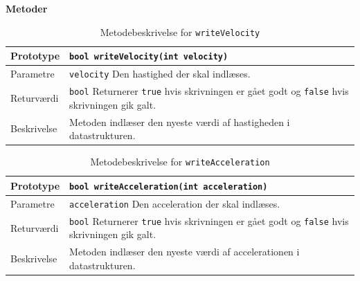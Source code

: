 \textbf{Metoder}
\begin{table}[h]
\begin{tabularx}{\textwidth}{| L{2.5 cm} | Z |} \hline
Prototype & \texttt{bool writeVelocity(int velocity)} \\\hline
Parametre & \texttt{velocity} \newline Den hastighed der skal indlæses. \\\hline
Returværdi &  \texttt{bool} \newline Returnerer \texttt{true} hvis skrivningen er gået godt og \texttt{false} hvis skrivningen gik galt. \\\hline
Beskrivelse & Metoden indlæser den nyeste værdi af hastigheden i datastrukturen. \\\hline
\end{tabularx}
\caption{Metodebeskrivelse for \texttt{writeVelocity}}
\label{table:met_writeVelocity}
\end{table}

\clearpage

\begin{table}
\begin{tabularx}{\textwidth}{| L{2.5 cm} | Z |} \hline
Prototype & \texttt{bool writeAcceleration(int acceleration)} \\\hline
Parametre & \texttt{acceleration} \newline Den acceleration der skal indlæses. \\\hline
Returværdi &  \texttt{bool} \newline Returnerer \texttt{true} hvis skrivningen er gået godt og \texttt{false} hvis skrivningen gik galt. \\\hline
Beskrivelse & Metoden indlæser den nyeste værdi af accelerationen i datastrukturen. \\\hline
\end{tabularx}
\caption{Metodebeskrivelse for \texttt{writeAcceleration}}
\label{table:met_writeAcceleration}
\end{table}

